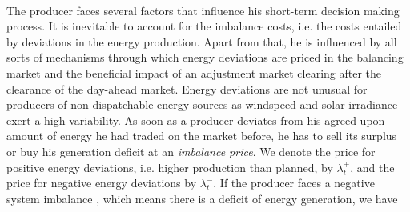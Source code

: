 \\ The producer faces several factors that influence his short-term decision making process. It is inevitable to account for the imbalance costs, i.e. the costs entailed by deviations in the energy production. Apart from that, he is influenced by all sorts of mechanisms through which energy deviations are priced in the balancing market and the beneficial impact of an adjustment market clearing after the clearance of the day-ahead market. Energy deviations are not unusual for producers of non-dispatchable energy sources as windspeed and solar irradiance exert a high variability. As soon as a producer deviates from his agreed-upon amount of energy he had traded on the market before, he has to sell its surplus or buy his generation deficit at an \textit{imbalance price}. We denote the price for positive energy deviations, i.e. higher production than planned, by $\lambda_{t}^{+}$, and the price for negative energy deviations by $\lambda_{t}^{-}$.  If the producer faces a negative system imbalance , which means there is a deficit of energy generation, we have

